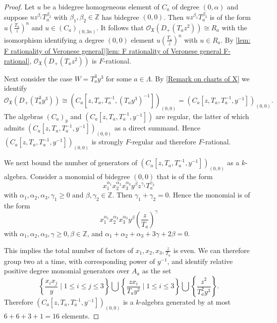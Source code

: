 \documentclass[reqno,11pt]{amsart}
\numberwithin{equation}{section}
\theoremstyle{definition}
\theoremstyle{definition}
\theoremstyle{definition}
\theoremstyle{remark}
\newcommand{\Z}{\mathbb{Z}}
\newcommand{\cO}{\mathcal{O}}
\begin{document}
\begin{proof}
    Let $u$ be a bidegree homogeneous element of $C_a$ of degree $(0,\alpha)$ and suppose $uz^{\beta_1}T_a^{\beta_2}$ with $\beta_1,\beta_2\in \Z$ has bidegree $(0,0)$. Then $uz^{\beta_1}T_a^{\beta_2}$ is of the form $u\left(\frac{T_a}{z}\right)^{n}$ and $u\in (C_a)_{(0,3n)}$. It follows that $\cO_\mathfrak{X}(D_+(T_az^2)) \cong R_a$ with the isomorphism identifying a degree $(0,0)$ element $u\left(\frac{T_a}{z}\right)^{n}$ with $u\in R_a$. By \cref{lem: F rationality of Veronese general}\ref{lem: F rationality of Veronese general F-rational}, $\cO_\mathfrak{X}(D_+(T_az^2))$ is $F$-rational.
    

    Next consider the case $W = T_a^3y^3$ for some $a\in\Lambda$. By \cref{Remark on charts of X} we identify
    \[
    \cO_{\mathfrak{X}}(D_+(T_a^3y^3)) \cong \left(C_a\left[z,T_a,T_a^{-1}, (T_ay^3)^{-1}\right]\right)_{(0,0)} = \left(C_a\left[z,T_a,T_a^{-1}, y^{-1}\right]\right)_{(0,0)}.
    \]
    The algebras $(C_a)_{y}$ and $\left(C_a\left[z,T_a,T_a^{-1}, y^{-1}\right]\right)$ are regular, the latter of which admits $\left(C_a\left[z,T_a,T_a^{-1}, y^{-1}\right]\right)_{(0,0)}$ as a direct summand. Hence $\left(C_a\left[z,T_a,T_a^{-1}, y^{-1}\right]\right)_{(0,0)}$ is strongly $F$-regular and therefore $F$-rational.

    We next bound the number of generators of $\left(C_a\left[z,T_a,T_a^{-1}, y^{-1}\right]\right)_{(0,0)}$ as a $k$-algebra. Consider a monomial of bidegree $(0,0)$ that is of the form
    \[
    x_1^{\alpha_1}x_2^{\alpha_2}x_3^{\alpha_3}y^{\beta}z^{\gamma_1}T_a^{\gamma_2}
    \]
    with $\alpha_1,\alpha_2,\alpha_3,\gamma_1\geq 0$ and $\beta,\gamma_2\in\Z$. Then $\gamma_1 +\gamma_2 = 0$. Hence the monomial is of the form
    \[
    x_1^{\alpha_1}x_2^{\alpha_2}x_3^{\alpha_3}y^{\beta}\left(\frac{z}{T_a}\right)^{\gamma}
    \]
    with $\alpha_1,\alpha_2,\alpha_3,\gamma\geq 0, \beta\in\Z$, and $\alpha_1 + \alpha_2 + \alpha_3 + 3\gamma +2\beta = 0$. 

    This implies the total number of factors of $x_1,x_2,x_3,\frac{z}{T_a}$ is even. We can therefore group two at a time, with corresponding power of $y^{-1}$, and identify relative positive degree monomial generators over $A_a$ as the set
    \[
    \left\{\frac{x_ix_j}{y}\mid 1\leq i\leq j\leq3\right\}\bigcup \left\{\frac{zx_i}{T_ay^2}\mid 1\leq i\leq 3\right\} \bigcup \left\{\frac{z^2}{T_a^2y^3}\right\}.
    \]
 Therefore $\left(C_a\left[z,T_a,T_a^{-1}, y^{-1}\right]\right)_{(0,0)}$ is a $k$-algebra generated by at most $6+6+3+1=16$ elements.


\end{proof}
\end{document}
